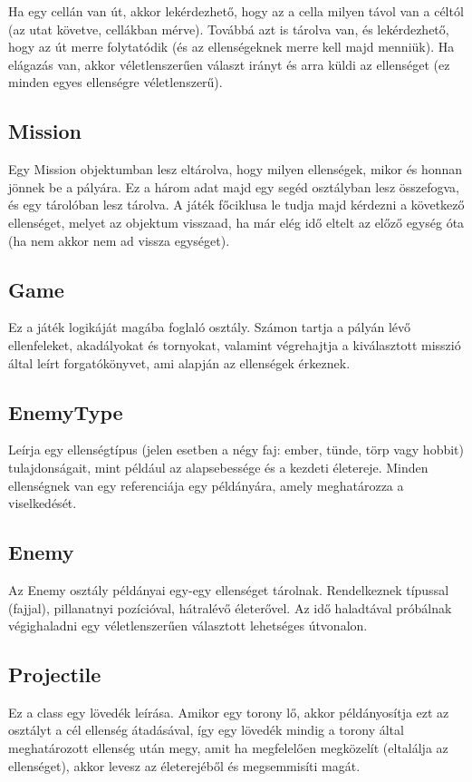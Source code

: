  Ha egy cellán van út, akkor lekérdezhető, hogy az a cella milyen távol van a céltól (az utat követve, cellákban mérve). Továbbá azt is tárolva van, és lekérdezhető, hogy az út merre folytatódik (és az ellenségeknek merre kell majd menniük). Ha elágazás van, akkor véletlenszerűen választ irányt és arra küldi az ellenséget (ez minden egyes ellenségre véletlenszerű).

\subsection{Mission}
Egy Mission objektumban lesz eltárolva, hogy milyen ellenségek, mikor és honnan jönnek be a pályára. Ez a három adat majd egy segéd osztályban lesz összefogva, és egy tárolóban lesz tárolva. A játék főciklusa le tudja majd kérdezni a következő ellenséget, melyet az objektum visszaad, ha már elég idő eltelt az előző egység óta (ha nem akkor nem ad vissza egységet).

\subsection{Game}

Ez a játék logikáját magába foglaló osztály. Számon tartja a pályán lévő ellenfeleket, akadályokat és tornyokat, valamint végrehajtja a kiválasztott misszió által leírt forgatókönyvet, ami alapján az ellenségek érkeznek.

\subsection{EnemyType}

Leírja egy ellenségtípus (jelen esetben a négy faj: ember, tünde, törp vagy hobbit) tulajdonságait, mint például az alapsebessége és a kezdeti életereje. Minden ellenségnek van egy referenciája egy példányára, amely meghatározza a viselkedését.

\subsection{Enemy}

Az Enemy osztály példányai egy-egy ellenséget tárolnak. Rendelkeznek típussal (fajjal), pillanatnyi pozícióval, hátralévő életerővel. Az idő haladtával próbálnak végighaladni egy véletlenszerűen választott lehetséges útvonalon.

\subsection{Projectile}
Ez a class egy lövedék leírása. Amikor egy torony lő, akkor példányosítja ezt az osztályt a cél ellenség átadásával, így egy lövedék mindig a torony által meghatározott ellenség után megy, amit ha megfelelően megközelít (eltalálja az ellenséget), akkor levesz az életerejéből és megsemmisíti magát.


